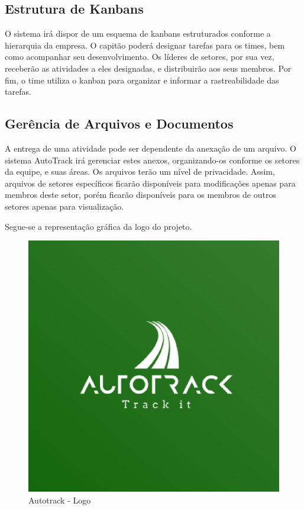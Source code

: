 \subsection{Estrutura de Kanbans}
O sistema irá dispor de um esquema de kanbans estruturados conforme a hierarquia da empresa. O capitão poderá designar tarefas para os times,
bem como acompanhar seu desenvolvimento. Os líderes de setores, por sua vez, receberão as atividades a eles designadas,
 e distribuirão aos seus membros. Por fim, o time utiliza o kanban para organizar e informar a rastreabilidade das tarefas.

\subsection{Gerência de Arquivos e Documentos}
A entrega de uma atividade pode ser dependente da anexação de um arquivo. O sistema AutoTrack irá
gerenciar estes anexos, organizando-os conforme os setores da equipe, e suas áreas. Os arquivos terão um nível de privacidade.
 Assim, arquivos de setores específicos ficarão disponíveis para modificações apenas para membros deste setor, porém
  ficarão disponíveis para os membros de outros setores apenas para visualização.

Segue-se a representação gráfica da logo do projeto.

  \begin{figure}[!h]
    \centering
    \includegraphics[keepaspectratio=true,scale=0.7]{figuras/logo.eps}
    \caption{Autotrack - Logo}
  \end{figure}

